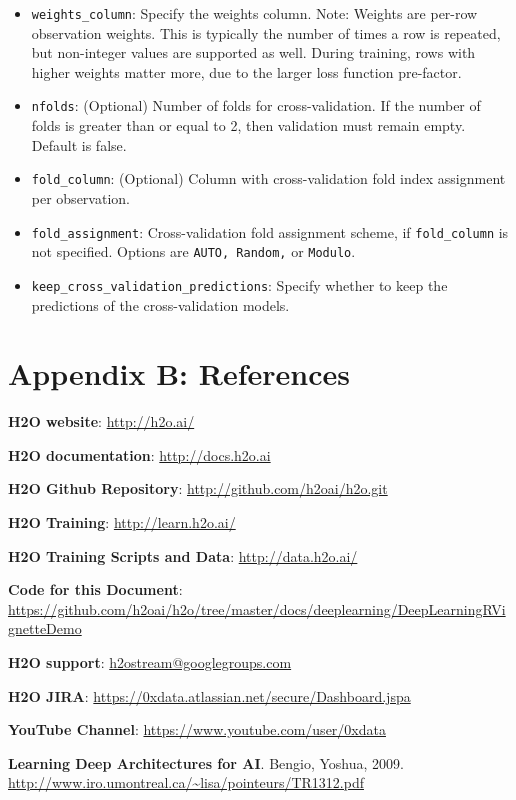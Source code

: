 \documentclass{article}[11pt]
\begin{document}
\begin{itemize}
\item \texttt{weights\_column}: Specify the weights column. Note: Weights are per-row observation weights. This is typically the number of times a row is repeated, but non-integer values are supported as well. During training, rows with higher weights matter more, due to the larger loss function pre-factor.
\item \texttt{nfolds}: (Optional) Number of folds for cross-validation. If the number of folds is greater than or equal to 2, then validation must remain empty. Default is false.
\item \texttt{fold\_column}: (Optional) Column with cross-validation fold index assignment per observation. 
\item \texttt{fold\_assignment}: Cross-validation fold assignment scheme, if \texttt{fold\_column} is not specified. Options are \texttt{AUTO, Random,} or \texttt{Modulo}. 
\item \texttt{keep\_cross\_validation\_predictions}: Specify whether to keep the predictions of the cross-validation models. 

\end{itemize}

\newpage
\section{Appendix B: References}

\textbf{H2O website}:  {\url{http://h2o.ai/}}

\textbf{H2O documentation}:  {\url{http://docs.h2o.ai}}

\textbf{H2O Github Repository}:  {\url{http://github.com/h2oai/h2o.git}}

\textbf{H2O Training}:    {\url{http://learn.h2o.ai/}}

\textbf{H2O Training Scripts and Data}: {\url{http://data.h2o.ai/}} 

\textbf{Code for this Document}:   \\
 {\url{https://github.com/h2oai/h2o/tree/master/docs/deeplearning/DeepLearningRVignetteDemo}}

\textbf{H2O support}:   {\url{h2ostream@googlegroups.com}}

\textbf{H2O JIRA}: {\url{https://0xdata.atlassian.net/secure/Dashboard.jspa}}

\textbf{YouTube Channel}: {\url{https://www.youtube.com/user/0xdata}}

\textbf{Learning Deep Architectures for AI}. Bengio, Yoshua, 2009. \\
 {\url{http://www.iro.umontreal.ca/~lisa/pointeurs/TR1312.pdf}}
\end{document}
